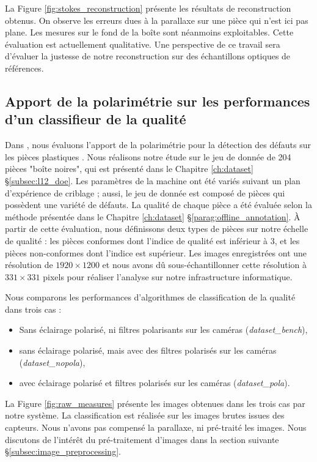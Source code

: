 La Figure \ref{fig:stokes_reconstruction} présente les résultats de reconstruction obtenus.
On observe les erreurs dues à la parallaxe sur une pièce qui n'est ici pas plane.
Les mesures sur le fond de la boîte sont néanmoins exploitables.
Cette évaluation est actuellement qualitative.
Une perspective de ce travail sera d'évaluer la justesse de notre reconstruction sur des échantillons optiques de références.


\subsection{Apport de la polarimétrie sur les performances d'un classifieur de la qualité}
\label{subsubsec:pola_results}

Dans , nous évaluons l'apport de la polarimétrie pour la détection des défauts sur les pièces plastiques \cite{nagorny_polarimetric_2019}.
Nous réalisons notre étude sur le jeu de donnée de 204 pièces "boîte noires", qui est présenté dans le Chapitre \ref{ch:dataset} §\ref{subsec:l12_doe}.
Les paramètres de la machine ont été variés suivant un plan d'expérience de criblage ; aussi, le jeu de donnée est composé de pièces qui possèdent une variété de défauts.
La qualité de chaque pièce a été évaluée selon la méthode présentée dans le Chapitre \ref{ch:dataset} §\ref{parag:offline_annotation}.
À partir de cette évaluation, nous définissons deux types de pièces sur notre échelle de qualité : les pièces conformes dont l'indice de qualité est inférieur à 3, et les pièces non-conformes dont l'indice est supérieur.
Les images enregistrées ont une résolution de $1920 \times 1200$ et nous avons dû sous-échantillonner cette résolution à $331 \times 331$ pixels pour réaliser l'analyse sur notre infrastructure informatique.

Nous comparons les performances d'algorithmes de classification de la qualité dans trois cas :
\begin{itemize}
	\item 
	Sans éclairage polarisé, ni filtres polarisants sur les caméras (\textit{dataset\_bench}),
	\item 
	sans éclairage polarisé, mais avec des filtres polarisés sur les caméras (\textit{dataset\_nopola}),
	\item avec éclairage polarisé et filtres polarisés sur les caméras (\textit{dataset\_pola}).
\end{itemize}
La Figure \ref{fig:raw_measures} présente les images obtenues dans les trois cas par notre système.
La classification est réalisée sur les images brutes issues des capteurs.
Nous n'avons pas compensé la parallaxe, ni pré-traité les images.
Nous discutons de l'intérêt du pré-traitement d'images dans la section suivante §\ref{subsec:image_preprocessing}.

